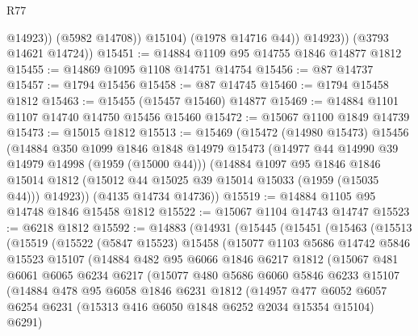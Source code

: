 \begin{lexlean}{R77}
\begin{coremodule}
                    @14923))
                (@5982 @14708))
              @15104)
            (@1978 @14716 @44))
          @14923))
      (@3793 @14621 @14724))
@15451 := @14884 @1109 @95 @14755 @1846 @14877 @1812
@15455 := @14869 @1095 @1108 @14751 @14754
@15456 := @87 @14737
@15457 := @1794 @15456
@15458 := @87 @14745
@15460 := @1794 @15458 @1812
@15463 := @15455 (@15457 @15460) @14877
@15469 := @14884 @1101 @1107 @14740 @14750 @15456 @15460
@15472 := @15067 @1100 @1849 @14739
@15473 := @15015 @1812
@15513 := @15469
    (@15472
      (@14980 @15473)
      @15456
      (@14884
        @350
        @1099
        @1846
        @1848
        @14979
        @15473
        (@14977 @44 @14990 @39 @14979 @14998 (@1959 (@15000 @44)))
        (@14884
          @1097
          @95
          @1846
          @1846
          @15014
          @1812
          (@15012 @44 @15025 @39 @15014 @15033 (@1959 (@15035 @44)))
          @14923))
      (@4135 @14734 @14736))
@15519 := @14884 @1105 @95 @14748 @1846 @15458 @1812
@15522 := @15067 @1104 @14743 @14747
@15523 := @6218 @1812
@15592 := @14883
    (@14931
      (@15445
        (@15451
          (@15463
            (@15513
              (@15519
                (@15522
                  (@5847 @15523)
                  @15458
                  (@15077
                    @1103
                    @5686
                    @14742
                    @5846
                    @15523
                    @15107
                    (@14884
                      @482
                      @95
                      @6066
                      @1846
                      @6217
                      @1812
                      (@15067
                        @481
                        @6061
                        @6065
                        @6234
                        @6217
                        (@15077
                          @480
                          @5686
                          @6060
                          @5846
                          @6233
                          @15107
                          (@14884
                            @478
                            @95
                            @6058
                            @1846
                            @6231
                            @1812
                            (@14957
                              @477
                              @6052
                              @6057
                              @6254
                              @6231
                              (@15313 @416 @6050 @1848 @6252 @2034 @15354 @15104)
                              @6291)

\end{coremodule}
\end{lexlean}

